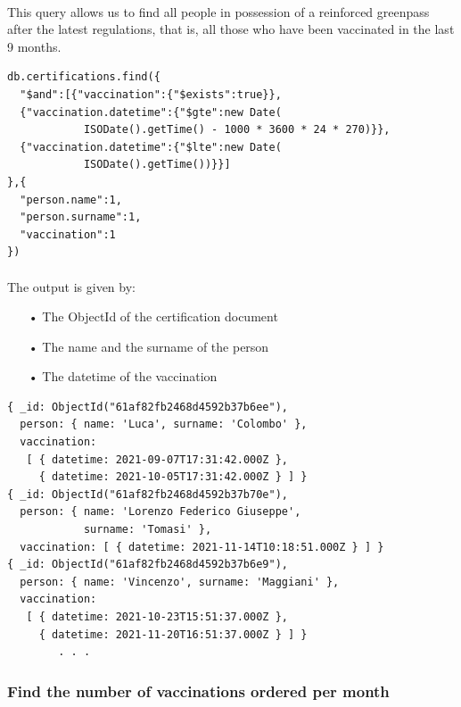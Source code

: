 \documentclass[a4paper,12pt]{article}
\begin{document}
\paragraph{} This query allows us to find all people in possession of a reinforced greenpass after the latest regulations, that is, all those who have been vaccinated in the last 9 months.
\begin{tcolorbox}[colback=green!5!white,colframe=green!75!black,title=QUERY]
\begin{verbatim}
db.certifications.find({
  "$and":[{"vaccination":{"$exists":true}},
  {"vaccination.datetime":{"$gte":new Date(
            ISODate().getTime() - 1000 * 3600 * 24 * 270)}},
  {"vaccination.datetime":{"$lte":new Date(
            ISODate().getTime())}}]
},{
  "person.name":1,
  "person.surname":1,
  "vaccination":1
})
\end{verbatim}
\end{tcolorbox}
\paragraph{} The output is given by: 
\begin{itemize}[noitemsep]
\item[•] The ObjectId of the certification document
\item[•] The name and the surname of the person 
\item[•] The datetime of the vaccination
\end{itemize}
\begin{tcolorbox}[colback=red!5!white,colframe=red!75!black,title=OUTPUT]
\begin{verbatim}
{ _id: ObjectId("61af82fb2468d4592b37b6ee"),
  person: { name: 'Luca', surname: 'Colombo' },
  vaccination: 
   [ { datetime: 2021-09-07T17:31:42.000Z },
     { datetime: 2021-10-05T17:31:42.000Z } ] }
{ _id: ObjectId("61af82fb2468d4592b37b70e"),
  person: { name: 'Lorenzo Federico Giuseppe', 
            surname: 'Tomasi' },
  vaccination: [ { datetime: 2021-11-14T10:18:51.000Z } ] }
{ _id: ObjectId("61af82fb2468d4592b37b6e9"),
  person: { name: 'Vincenzo', surname: 'Maggiani' },
  vaccination: 
   [ { datetime: 2021-10-23T15:51:37.000Z },
     { datetime: 2021-11-20T16:51:37.000Z } ] }
        . . .
\end{verbatim}
\end{tcolorbox}
\clearpage
\subsubsection{Find the number of vaccinations ordered per month}
\end{document}
